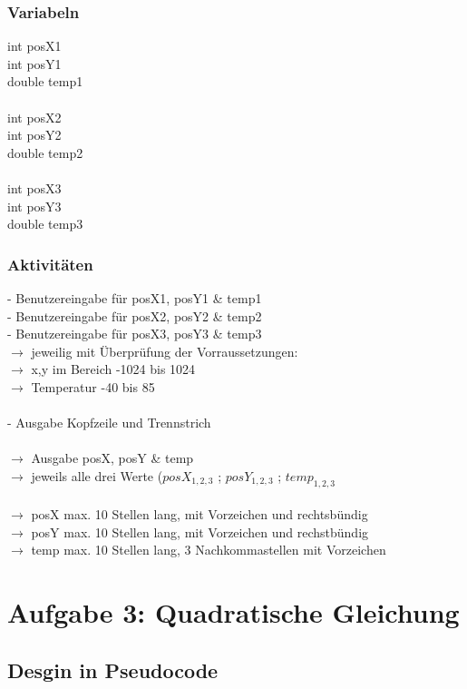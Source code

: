 \documentclass[10pt,a4paper]{report}
\begin{document}
	\subsubsection*{Variabeln}
	int posX1\\
	int posY1\\
	double temp1\\\\
	int posX2\\
	int posY2\\
	double temp2\\\\
	int posX3\\
	int posY3\\
	double temp3\\
	
	\subsubsection*{Aktivitäten}
	- Benutzereingabe für posX1, posY1 \& temp1\\
	- Benutzereingabe für posX2, posY2 \& temp2\\
	- Benutzereingabe für posX3, posY3 \& temp3\\
	$\rightarrow$ jeweilig mit Überprüfung der Vorraussetzungen:\\
	$\longrightarrow$ x,y im Bereich -1024 bis 1024\\
	$\longrightarrow$ Temperatur -40 bis 85\\
	\\
	- Ausgabe Kopfzeile und Trennstrich\\
	\\
	$\rightarrow$ Ausgabe posX, posY \& temp\\
	$\rightarrow$ jeweils alle drei Werte ($posX_{1,2,3}$ ;  $posY_{1,2,3}$ ; $temp_{1,2,3}$
	\\\\
	$\longrightarrow$ posX max. 10 Stellen lang, mit Vorzeichen und rechtsbündig\\
	$\longrightarrow$ posY max. 10 Stellen lang, mit Vorzeichen und rechstbündig\\
	$\longrightarrow$ temp max. 10 Stellen lang, 3 Nachkommastellen mit Vorzeichen\\
	
	\newpage
	\section*{Aufgabe 3: Quadratische Gleichung}
	\subsection*{Desgin in Pseudocode}
\end{document}
